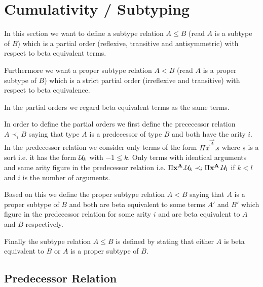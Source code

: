 \begin{comment}
    todo:

    - prove A <= B => t -> u => A[x:=t] <= B[x:=u]

    - prove all (x:A1): B1 <= all (x:A2): B2 => A1 ~ A2 and B1 <= B2

\end{comment}


\section{Cumulativity / Subtyping}

In this section we want to define a subtype relation $A \le B$ (read $A$ is a
subtype of $B$) which is a partial order (reflexive, transitive and
antisymmetric) with respect to beta equivalent terms.

Furthermore we want a proper subtype relation $A < B$ (read $A$ is a proper
subtype of $B$) which is a strict partial order (irreflexive and transitive)
with respect to beta equivalence.

In the partial orders we regard beta equivalent terms as the same terms.

In order to define the partial orders we first define the prececessor relation
$A \prec_i B$ saying that type $A$ is a predecessor of type $B$ and both have
the arity $i$. In the predecessor relation we consider only terms of the form
$\Pi \vec{x}^\vec{A}. s$ where $s$ is a sort i.e. it has the form ${\cal U}_k$ with
$-1 \le k$. Only terms with identical arguments and same arity figure in the
predecessor relation i.e. $\Pi {\mathbf x}^{\mathbf A}. {\cal U}_k \prec_i \Pi
{\mathbf x}^{\mathbf A}. {\cal U}_l$ if $k < l$ and $i$ is the number of arguments.

Based on this we define the proper subtype relation $A < B$ saying that $A$ is a
proper subtype of $B$ and both are beta equivalent to some terms $A'$ and $B'$
which figure in the predecessor relation for some arity $i$ and are beta
equivalent to $A$ and $B$ respectively.

Finally the subtype relation $A \le B$ is defined by stating that either $A$ is
beta equivalent to $B$ or $A$ is a proper subtype of $B$.



\subsection{Predecessor Relation}

